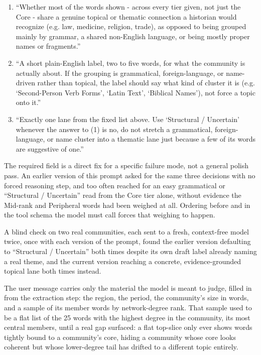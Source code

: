 \documentclass[11pt]{article}
\begin{document}
\begin{quotebox}
\begin{enumerate}[itemsep=0.3em]
  \item ``Whether most of the words shown - across every tier given, not
    just the Core - share a genuine topical or thematic connection a
    historian would recognize (e.g. law, medicine, religion, trade), as
    opposed to being grouped mainly by grammar, a shared non-English
    language, or being mostly proper names or fragments.''
  \item ``A short plain-English label, two to five words, for what the
    community is actually about. If the grouping is grammatical,
    foreign-language, or name-driven rather than topical, the label
    should say what kind of cluster it is (e.g. `Second-Person Verb
    Forms', `Latin Text', `Biblical Names'), not force a topic onto it.''
  \item ``Exactly one lane from the fixed list above. Use `Structural /
    Uncertain' whenever the answer to (1) is no, do not stretch a
    grammatical, foreign-language, or name cluster into a thematic lane
    just because a few of its words are suggestive of one.''
\end{enumerate}
\end{quotebox}

The required  field is a direct fix for a specific
failure mode, not a general polish pass. An earlier version of this
prompt asked for the same three decisions with no forced reasoning step,
and too often reached for an easy grammatical or ``Structural /
Uncertain'' read from the Core tier alone, without evidence the Mid-rank
and Peripheral words had been weighed at all. Ordering 
before  and  in the tool schema the model must
call forces that weighing to happen.

A blind check on two real communities, each sent to a fresh,
context-free model twice, once with each version of the prompt, found
the earlier version defaulting to ``Structural / Uncertain'' both times
despite its own draft label already naming a real theme, and the current
version reaching a concrete, evidence-grounded topical lane both times
instead.

The user message carries only the material the model is meant to judge,
filled in from the extraction step: the region, the period, the
community's size in words, and a sample of its member words by
network-degree rank. That sample used to be a flat list of the 25
words with the highest degree in the community, its most central
members, until a real gap surfaced: a flat top-slice only ever shows
words tightly bound to a community's core, hiding a community whose
core looks coherent but whose lower-degree tail has drifted to a
different topic entirely.
\end{document}
